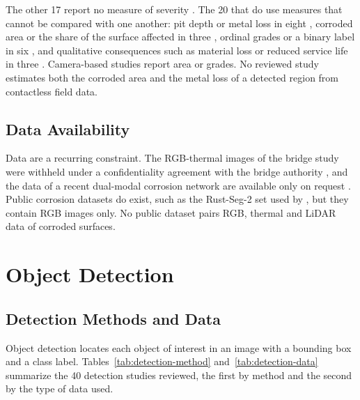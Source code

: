 The other 17 report no measure of severity
\citep{Li2022,Nash2022,Nguyen2026,Doshvarpassand2022,Lavadiya2022,Maharjan2025,Mao2026,PallasEnguita2025,Khodabux2020,Yu2023,HerndonTien2025,DeKerf2022,Liang2021,Espinoza2026,Alvani2026,Imran2025,Yao2019}.
The 20 that do use measures that cannot be compared with one another: pit depth
or metal loss in eight \citep{Liu2026,Wang2021,Qin2026,Egodawela2025,Akhlaghi2023,Huang2026a,Khodabux2021a,Yang2025}, corroded area or
the share of the surface affected in three \citep{Savino2025,Suzuki2026,Hu2023}, ordinal grades
or a binary label in six \citep{Bui2026,Hernndez-Surez2026,Rahman2021,Arias2025,Fu2024,Malashin2024}, and qualitative
consequences such as material loss or reduced service life in three
\citep{Elizalde2023,Wojciechowski2025,Yang2026a}. Camera-based studies report area or grades. No reviewed study
estimates both the corroded area and the metal loss of a detected region from
contactless field data.

\subsection{Data Availability}

Data are a recurring constraint. The RGB-thermal images of the bridge study were
withheld under a confidentiality agreement with the bridge authority \citep{Lim2021}, and
the data of a recent dual-modal corrosion network are available only on request
\citep{Mao2026}. Public corrosion datasets do exist, such as the Rust-Seg-2 set used by
\citet{Espinoza2026}, but they contain RGB images only. No public dataset pairs RGB, thermal
and LiDAR data of corroded surfaces.

\section{Object Detection}
\label{sec:lr-detection}

\subsection{Detection Methods and Data}

Object detection locates each object of interest in an image with a bounding box
and a class label. Tables~\ref{tab:detection-method} and~\ref{tab:detection-data}
summarize the 40 detection studies reviewed, the first by method and the second
by the type of data used.

